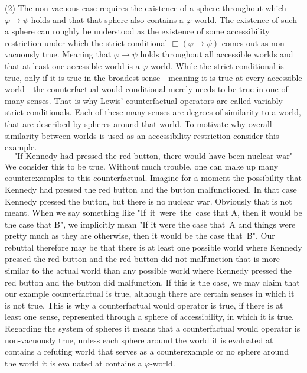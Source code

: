 \documentclass[a4paper,american,10pt]{paper}
\theoremstyle{definition}\newtheorem{definition}{Definition}
\begin{document}
(2) The non-vacuous case requires the existence of a sphere throughout which $\varphi\rightarrow\psi$ holds and that that sphere also contains a $\varphi$-world. The existence of such a sphere can roughly be understood as the existence of some accessibility restriction under which the strict conditional $\Box (\varphi\rightarrow\psi)$ comes out as non-vacuously true. Meaning that $\varphi\rightarrow\psi$ holds throughout all accessible worlds and that at least one accessible world is a $\varphi$-world. While the strict conditional is true, only if it is true in the broadest sense---meaning it is true at every accessible world---the counterfactual would conditional merely needs to be true in one of many senses. That is why Lewis' counterfactual operators are called variably strict conditionals. Each of these many senses are degrees of similarity to a world, that are described by spheres around that world. To motivate why overall similarity between worlds is used as an accessibility restriction consider this example.
\begin{equation}
\text{"If Kennedy had pressed the red button, there would have been nuclear war"}
\end{equation}
We consider this to be true. Without much trouble, one can make up many counterexamples to this counterfactual. Imagine for a moment the possibility that Kennedy had pressed the red button and the button malfunctioned. In that case Kennedy pressed the button, but there is no nuclear war. Obviously that is not meant. When we say something like "If~it~were~the~case that A, then it would be the case that B", we implicitly mean "If it were the case that~A and things were pretty much as they are otherwise, then it would be the case that~B". Our rebuttal therefore may be that there is at least one possible world where Kennedy pressed the red button and the red button did not malfunction that is more similar to the actual world than any possible world where Kennedy pressed the red button and the button did malfunction. If this is the case, we may claim that our example counterfactual is true, although there are certain senses in which it is not true. This is why a counterfactual would operator is true, if there is at least one sense, represented through a sphere of accessibility, in which it is true. Regarding the system of spheres it means that a counterfactual would operator is non-vacuously true, unless each sphere around the world it is evaluated at contains a refuting world that serves as a counterexample or no sphere around the world it is evaluated at contains a $\varphi$-world.
\end{document}
